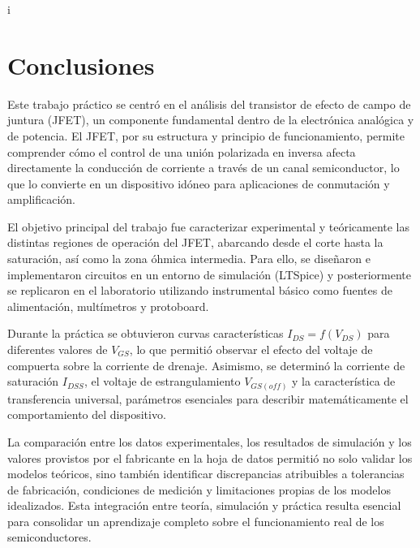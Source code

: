 i\chapter{Conclusiones}
Este trabajo práctico se centró en el análisis del transistor de efecto de campo de juntura (JFET), un
componente fundamental dentro de la electrónica analógica y de potencia. El JFET, por su estructura y
principio de funcionamiento, permite comprender cómo el control de una unión polarizada en inversa
afecta directamente la conducción de corriente a través de un canal semiconductor, lo que lo convierte
en un dispositivo idóneo para aplicaciones de conmutación y amplificación.  

El objetivo principal del trabajo fue caracterizar experimental y teóricamente las distintas regiones 
de operación del JFET, abarcando desde el corte hasta la saturación, así como la zona óhmica 
intermedia. Para ello, se diseñaron e implementaron circuitos en un entorno de simulación (LTSpice) 
y posteriormente se replicaron en el laboratorio utilizando instrumental básico como fuentes de 
alimentación, multímetros y protoboard.  

Durante la práctica se obtuvieron curvas características $I_{DS} = f(V_{DS})$ para diferentes valores 
de $V_{GS}$, lo que permitió observar el efecto del voltaje de compuerta sobre la corriente de drenaje. 
Asimismo, se determinó la corriente de saturación $I_{DSS}$, el voltaje de estrangulamiento 
$V_{GS(off)}$ y la característica de transferencia universal, parámetros esenciales para describir 
matemáticamente el comportamiento del dispositivo.  

La comparación entre los datos experimentales, los resultados de simulación y los valores provistos 
por el fabricante en la hoja de datos permitió no solo validar los modelos teóricos, sino también 
identificar discrepancias atribuibles a tolerancias de fabricación, condiciones de medición y 
limitaciones propias de los modelos idealizados. Esta integración entre teoría, simulación y práctica 
resulta esencial para consolidar un aprendizaje completo sobre el funcionamiento real de los 
semiconductores.   
